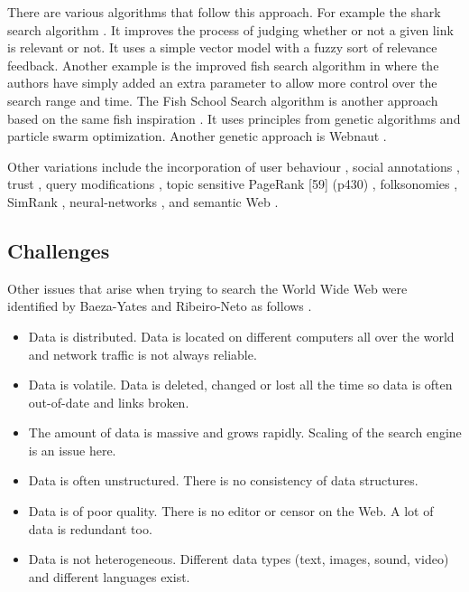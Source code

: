 There are various algorithms that follow this approach. For example the shark search algorithm \autocite{Hersovici1998}. It improves the process of judging whether or not a given link is relevant or not. It uses a simple vector model with a fuzzy sort of relevance feedback. Another example is the improved fish search algorithm in \autocite{Luo2005} where the authors have simply added an extra parameter to allow more control over the search range and time. The Fish School Search algorithm is another approach based on the same fish inspiration \autocite{BastosFilho2008}. It uses principles from genetic algorithms and particle swarm optimization. Another genetic approach is Webnaut \autocite{Nick2001}.

Other variations include the incorporation of user behaviour \autocite{Agichtein2006}, social annotations \autocite{Bao2007}, trust \autocite{Garcia-Molina2004}, query modifications \autocite{Glover2001}, topic sensitive PageRank [59] (p430) \autocite{Haveliwala2003}, folksonomies \autocite{Hotho2006}, SimRank \autocite{Jeh2002}, neural-networks \autocite{Shu1999}, and semantic Web \autocite{Widyantoro2001,Du2007,Ding2004,Kamps2010,Taye2009}.


\subsection{Challenges}

Other issues that arise when trying to search the World Wide Web were identified by Baeza-Yates and Ribeiro-Neto as follows \citeyear[p.449]{Baeza-Yates2011}.

\begin{itemize}
  \item Data is distributed. Data is located on different computers all over the world and network traffic is not always reliable.
  \item Data is volatile. Data is deleted, changed or lost all the time so data is often out-of-date and links broken.
  \item The amount of data is massive and grows rapidly. Scaling of the search engine is an issue here.
  \item Data is often unstructured. There is no consistency of data structures.
  \item Data is of poor quality. There is no editor or censor on the Web. A lot of data is redundant too.
  \item Data is not heterogeneous. Different data types (text, images, sound, video) and different languages exist.
\end{itemize}

